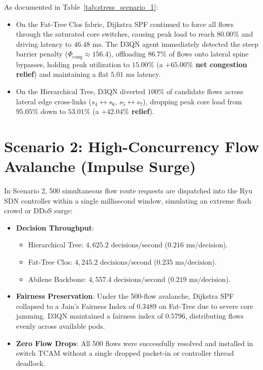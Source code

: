 As documented in Table~\ref{tab:stress_scenario_1}:
\begin{itemize}
    \item On the Fat-Tree Clos fabric, Dijkstra SPF continued to force all flows through the saturated core switches, causing peak load to reach $80.00\%$ and driving latency to $46.48\text{ ms}$. The D3QN agent immediately detected the steep barrier penalty ($\Phi_{\text{cong}} \approx 156.4$), offloading $86.7\%$ of flows onto lateral spine bypasses, holding peak utilization to \textbf{$15.00\%$} (a \textbf{$+65.00\%$ net congestion relief}) and maintaining a flat \textbf{$5.01\text{ ms}$} latency.
    \item On the Hierarchical Tree, D3QN diverted $100\%$ of candidate flows across lateral edge cross-links ($s_4 \leftrightarrow s_6$, $s_5 \leftrightarrow s_7$), dropping peak core load from $95.05\%$ down to $53.01\%$ (a \textbf{$+42.04\%$ relief}).
\end{itemize}

\section{Scenario 2: High-Concurrency Flow Avalanche (Impulse Surge)}
In Scenario 2, 500 simultaneous flow route requests are dispatched into the Ryu SDN controller within a single millisecond window, simulating an extreme flash crowd or DDoS surge:
\begin{itemize}
    \item \textbf{Decision Throughput}:
    \begin{itemize}
        \item Hierarchical Tree: \textbf{$4,625.2\text{ decisions/second}$} ($0.216\text{ ms/decision}$).
        \item Fat-Tree Clos: \textbf{$4,245.2\text{ decisions/second}$} ($0.235\text{ ms/decision}$).
        \item Abilene Backbone: \textbf{$4,557.4\text{ decisions/second}$} ($0.219\text{ ms/decision}$).
    \end{itemize}
    \item \textbf{Fairness Preservation}: Under the 500-flow avalanche, Dijkstra SPF collapsed to a Jain's Fairness Index of $0.3489$ on Fat-Tree due to severe core jamming. D3QN maintained a fairness index of \textbf{$0.5796$}, distributing flows evenly across available pods.
    \item \textbf{Zero Flow Drops}: All 500 flows were successfully resolved and installed in switch TCAM without a single dropped packet-in or controller thread deadlock.
\end{itemize}

